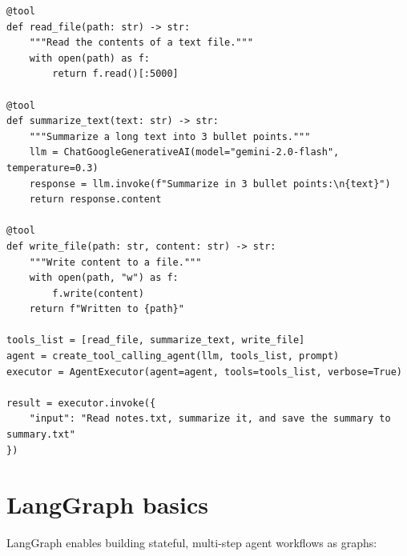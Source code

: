\begin{verbatim}
@tool
def read_file(path: str) -> str:
    """Read the contents of a text file."""
    with open(path) as f:
        return f.read()[:5000]

@tool
def summarize_text(text: str) -> str:
    """Summarize a long text into 3 bullet points."""
    llm = ChatGoogleGenerativeAI(model="gemini-2.0-flash", temperature=0.3)
    response = llm.invoke(f"Summarize in 3 bullet points:\n{text}")
    return response.content

@tool
def write_file(path: str, content: str) -> str:
    """Write content to a file."""
    with open(path, "w") as f:
        f.write(content)
    return f"Written to {path}"

tools_list = [read_file, summarize_text, write_file]
agent = create_tool_calling_agent(llm, tools_list, prompt)
executor = AgentExecutor(agent=agent, tools=tools_list, verbose=True)

result = executor.invoke({
    "input": "Read notes.txt, summarize it, and save the summary to summary.txt"
})
\end{verbatim}

\section{LangGraph basics}

LangGraph enables building stateful, multi-step agent workflows as graphs:

